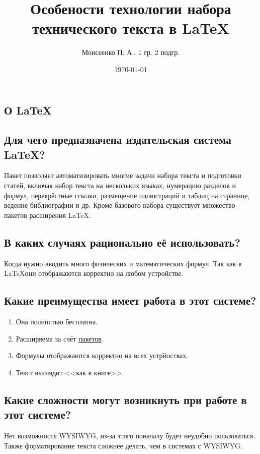 \documentclass[a4paper,12pt]{article} %
\author{Моисеенко П. А., 1 гр. 2 подгр.}
\title{Особености технологии набора технического текста в \LaTeX{}}
\date{\today}
\begin{document}
\maketitle
\newpage
\begin{center}
\section{О \LaTeX}
\end{center}
\subsection{Для чего предназначена издательская система \LaTeX?}
Пакет позволяет автоматизировать многие задачи набора текста и подготовки статей, включая набор текста на нескольких языках, нумерацию разделов и формул, перекрёстные ссылки, размещение иллюстраций и таблиц на странице, ведение библиографии и др. Кроме базового набора существует множество пакетов расширения \LaTeX.
\subsection{В каких случаях рационально её использовать?}
\begin{flushright}
Когда нужно вводить много физических и математических формул. Так как в \LaTeX они отображаются корректно на любом устройстве.
\end{flushright}
\subsection{Какие преимущества имеет работа в этот системе?}
\begin{flushleft}
\begin{enumerate}
\item Она {\Large полностью бесплатна}.
\item Расширяема за счёт \href{https://www.ctan.org/pkg}{пакетов}.
\item Формулы отображаются корректно на всех устрйоствах.
\item Текст выглядит <<как в книге>>.
\end{enumerate}
\end{flushleft}
\subsection{Какие сложности могут возникнуть при работе в этот системе?}
Нет возможность WYSIWYG, из-за этого поначалу будет неудобно пользоваться. Также форматирование текста сложнее делать, чем в системах с WYSIWYG.
\end{document}
